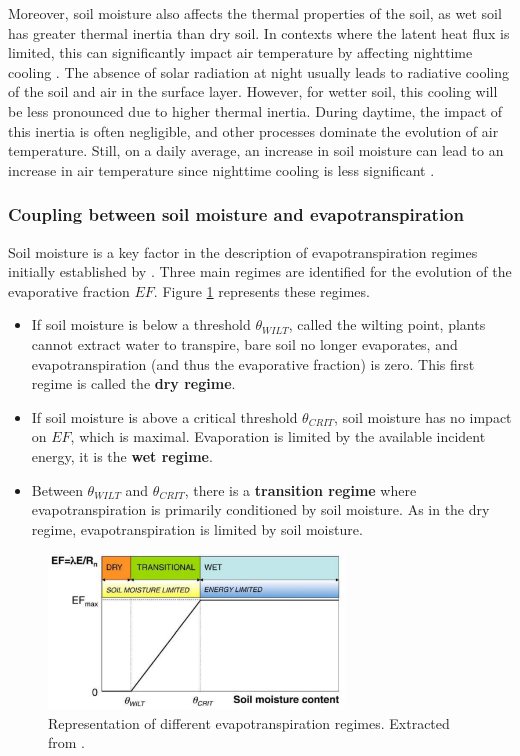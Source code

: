 Moreover, soil moisture also affects the thermal properties of the soil, as wet soil has greater thermal inertia than dry soil. In contexts where the latent heat flux is limited, this can significantly impact air temperature by affecting nighttime cooling \citep{ait-mesbah_role_2015}. The absence of solar radiation at night usually leads to radiative cooling of the soil and air in the surface layer. However, for wetter soil, this cooling will be less pronounced due to higher thermal inertia. During daytime, the impact of this inertia is often negligible, and other processes dominate the evolution of air temperature. Still, on a daily average, an increase in soil moisture can lead to an increase in air temperature since nighttime cooling is less significant \citep{cheruy_role_2017}.

\subsubsection*{Coupling between soil moisture and evapotranspiration}

Soil moisture is a key factor in the description of evapotranspiration regimes initially established by \citet{Budyko_1956, Budyko_1974}. Three main regimes are identified for the evolution of the evaporative fraction $EF$. Figure \ref{fig:evap_regimes} represents these regimes.

\begin{itemize}
    \item If soil moisture is below a threshold $\theta_{WILT}$, called the wilting point, plants cannot extract water to transpire, bare soil no longer evaporates, and evapotranspiration (and thus the evaporative fraction) is zero. This first regime is called the \textbf{dry regime}.
    \item If soil moisture is above a critical threshold $\theta_{CRIT}$, soil moisture has no impact on $EF$, which is maximal. Evaporation is limited by the available incident energy, it is the \textbf{wet regime}.
    \item Between $\theta_{WILT}$ and $\theta_{CRIT}$, there is a \textbf{transition regime} where evapotranspiration is primarily conditioned by soil moisture. As in the dry regime, evapotranspiration is limited by soil moisture.
\end{itemize}

\begin{figure}[ht]
    \centering
    \includegraphics[width=0.7\textwidth]{images/intro/evap_regimes.png}
    \caption{Representation of different evapotranspiration regimes. Extracted from \citet{seneviratne_investigating_2010}.}
    \label{fig:evap_regimes}
\end{figure}

